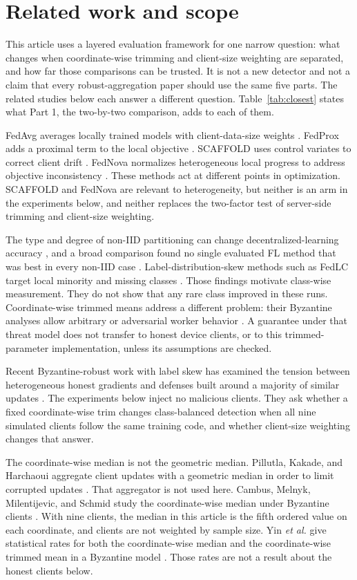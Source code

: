 \documentclass{ieeeaccess}
\begin{document}
\section{Related work and scope}
This article uses a layered evaluation framework for one narrow question: what changes when coordinate-wise trimming and client-size weighting are separated, and how far those comparisons can be trusted. It is not a new detector and not a claim that every robust-aggregation paper should use the same five parts. The related studies below each answer a different question. Table~\ref{tab:closest} states what Part 1, the two-by-two comparison, adds to each of them.

FedAvg averages locally trained models with client-data-size weights \cite{mcmahan17}. FedProx adds a proximal term to the local objective \cite{li20}. SCAFFOLD uses control variates to correct client drift \cite{karimireddy20}. FedNova normalizes heterogeneous local progress to address objective inconsistency \cite{wang20fednova}. These methods act at different points in optimization. SCAFFOLD and FedNova are relevant to heterogeneity, but neither is an arm in the experiments below, and neither replaces the two-factor test of server-side trimming and client-size weighting.

The type and degree of non-IID partitioning can change decentralized-learning accuracy \cite{hsieh20}, and a broad comparison found no single evaluated FL method that was best in every non-IID case \cite{li22noniid}. Label-distribution-skew methods such as FedLC target local minority and missing classes \cite{zhang22fedlc}. Those findings motivate class-wise measurement. They do not show that any rare class improved in these runs. Coordinate-wise trimmed means address a different problem: their Byzantine analyses allow arbitrary or adversarial worker behavior \cite{yin18}. A guarantee under that threat model does not transfer to honest device clients, or to this trimmed-parameter implementation, unless its assumptions are checked.

Recent Byzantine-robust work with label skew has examined the tension between heterogeneous honest gradients and defenses built around a majority of similar updates \cite{bao24}. The experiments below inject no malicious clients. They ask whether a fixed coordinate-wise trim changes class-balanced detection when all nine simulated clients follow the same training code, and whether client-size weighting changes that answer.

The coordinate-wise median is not the geometric median. Pillutla, Kakade, and Harchaoui aggregate client updates with a geometric median in order to limit corrupted updates \cite{pillutla22}. That aggregator is not used here. Cambus, Melnyk, Milentijevic, and Schmid study the coordinate-wise median under Byzantine clients \cite{cambus25}. With nine clients, the median in this article is the fifth ordered value on each coordinate, and clients are not weighted by sample size. Yin \emph{et al.} give statistical rates for both the coordinate-wise median and the coordinate-wise trimmed mean in a Byzantine model \cite{yin18}. Those rates are not a result about the honest clients below.
\end{document}
